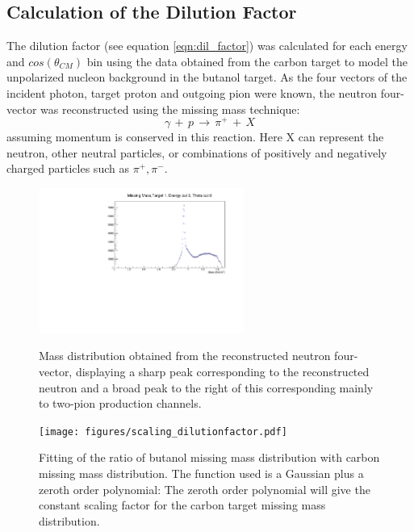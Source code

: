 \subsection{Calculation of the Dilution Factor}
\label{ch:dil_factor}
The dilution factor (see equation \ref{eqn:dil_factor}) was calculated for each energy and $cos(\theta_{CM})$ bin using the data obtained from the carbon target to model the unpolarized nucleon background in the butanol target.
As the four vectors of the incident photon, target proton and outgoing pion were known, the neutron four-vector was reconstructed using the missing mass technique:
$$
\gamma \, + \,  p \, \rightarrow \, \pi^+ \, + \, X
$$
assuming momentum is conserved in this reaction. Here X can represent the neutron, other neutral particles, or combinations of positively and negatively charged particles such as $\pi^+ , \pi^-$.
\begin{figure}[H]
  \begin{center}
    \includegraphics[width=0.6\textwidth]{figures/neutron_missingmass.pdf} \\
    \caption{Mass distribution obtained from the reconstructed neutron four-vector, displaying a sharp peak corresponding to the reconstructed neutron and
a broad peak to the right of this corresponding mainly to two-pion production channels. }
    \label{fig:frost_neutronmissing_ex}
  \end{center}
\end{figure}
\begin{figure}[H]
  \begin{center}
    \texttt{[image: figures/scaling\_dilutionfactor.pdf]} \\
    \caption{Fitting of the ratio of butanol missing mass distribution with carbon missing mass distribution. The function used is a Gaussian plus a zeroth order polynomial: The zeroth order polynomial will give the constant scaling factor for the carbon target missing mass distribution. }
    \label{fig:scaling_dilutionfactor}
  \end{center}
\end{figure}
